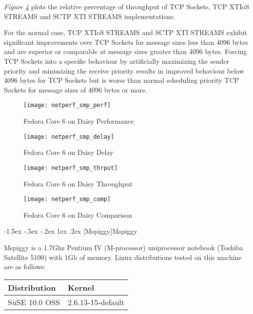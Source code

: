 \documentclass[letterpaper,final,notitlepage,twocolumn,10pt,twoside]{article}
\makeatletter
\renewcommand\subsection{\@startsection{subsection}{2}{\z@}%
                                     {-1.5ex \@plus -.5ex \@minus -.2ex}%
                                     {1ex \@plus .2ex}%
                                     {\normalfont\normalsize\bfseries}}
\makeatother
\begin{document}
\begin{description}
\textit{Figure \ref{figure:smpcomp}}
plots the relative percentage of throughput of TCP Sockets, TCP XTIoS STREAMS and SCTP XTI STREAMS
implementations.

For the normal case, TCP XTIoS STREAMS and SCTP XTI STREAMS exhibit significant improvements over
TCP Sockets for message sizes less than 4096 bytes and are superior or comparable  at message sizes
greater than 4096 bytes.  Forcing TCP Sockets into a specific behaviour by artificially maximizing
the sender priority and minimizing the receive priority results in improved behaviour below 4096
bytes for TCP Sockets but is worse than normal scheduling priority TCP Sockets for message sizes of
4096 bytes or more.

\end{description}

\begin{figure}[p]
\center\texttt{[image: netperf\_smp\_perf]}
\caption[Fedora Core 6 on Daisy Performance]{Fedora Core 6 on Daisy Performance}
\label{figure:smpperf}
\end{figure}

\begin{figure}[p]
\center\texttt{[image: netperf\_smp\_delay]}
\caption[Fedora Core 6 on Daisy Delay]{Fedora Core 6 on Daisy Delay}
\label{figure:smpdly}
\end{figure}

\begin{figure}[p]
\center\texttt{[image: netperf\_smp\_thrput]}
\caption[Fedora Core 6 on Daisy Throughput]{Fedora Core 6 on Daisy Throughput}
\label{figure:smpthrput}
\end{figure}

\begin{figure}[pt]
\center\texttt{[image: netperf\_smp\_comp]}
\caption[Fedora Core 6 on Daisy Comparison]{Fedora Core 6 on Daisy Comparison}
\label{figure:smpcomp}
\end{figure}

\subsection[Mspiggy]{Mspiggy}

Mspiggy is a 1.7Ghz Pentium IV (M-processor) uniprocessor notebook (Toshiba Satellite 5100) with 1Gb
of memory.  Linux distributions tested on this machine are as follows:

\small
\setlength{\tabcolsep}{0.4em}
\setlength{\arraycolsep}{0.4em}
\begin{tabular}{ll}\\
Distribution & Kernel\\
\hline
SuSE 10.0 OSS & 2.6.13-15-default\\
\end{tabular}\\[1.0ex]
\normalsize
\end{document}

